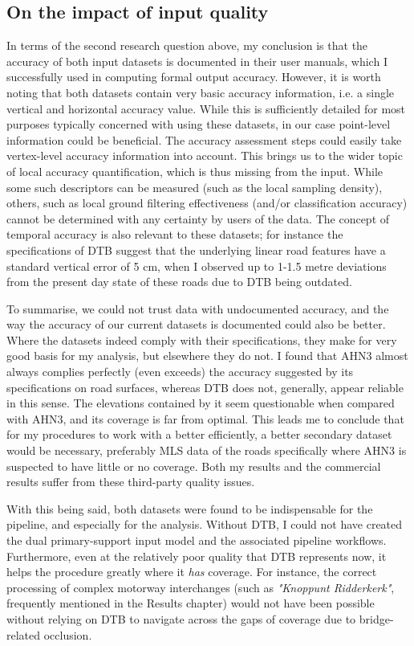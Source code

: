 \subsection{On the impact of input quality}
\label{sub:usefulnessquality}

In terms of the second research question above, my conclusion is that the accuracy of both input datasets is documented in their user manuals, which I successfully used in computing formal output accuracy. However, it is worth noting that both datasets contain very basic accuracy information, i.e. a single vertical and horizontal accuracy value. While this is sufficiently detailed for most purposes typically concerned with using these datasets, in our case point-level information could be beneficial. The accuracy assessment steps could easily take vertex-level accuracy information into account. This brings us to the wider topic of local accuracy quantification, which is thus missing from the input. While some such descriptors can be measured (such as the local sampling density), others, such as local ground filtering effectiveness (and/or classification accuracy) cannot be determined with any certainty by users of the data. The concept of temporal accuracy is also relevant to these datasets; for instance the specifications of DTB suggest that the underlying linear road features have a standard vertical error of 5 cm, when I observed up to 1-1.5 metre deviations from the present day state of these roads due to DTB being outdated.

To summarise, we could not trust data with undocumented accuracy, and the way the accuracy of our current datasets is documented could also be better. Where the datasets indeed comply with their specifications, they make for very good basis for my analysis, but elsewhere they do not. I found that AHN3 almost always complies perfectly (even exceeds) the accuracy suggested by its specifications on road surfaces, whereas DTB does not, generally, appear reliable in this sense. The elevations contained by it seem questionable when compared with AHN3, and its coverage is far from optimal. This leads me to conclude that for my procedures to work with a better efficiently, a better secondary dataset would be necessary, preferably MLS data of the roads specifically where AHN3 is suspected to have little or no coverage. Both my results and the commercial results suffer from these third-party quality issues.

With this being said, both datasets were found to be indispensable for the pipeline, and especially for the analysis. Without DTB, I could not have created the dual primary-support input model and the associated pipeline workflows. Furthermore, even at the relatively poor quality that DTB represents now, it helps the procedure greatly where it \textit{has} coverage. For instance, the correct processing of complex motorway interchanges (such as \textit{"Knoppunt Ridderkerk"}, frequently mentioned in the Results chapter) would not have been possible without relying on DTB to navigate across the gaps of coverage due to bridge-related occlusion.

